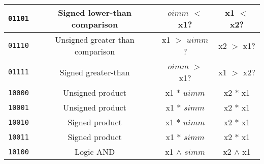 \begin{center}
\begin{longtable}{|c|c|c|c|}
    \texttt{01101}                       &
    Signed lower-than comparison         &
    $oimm$ $<$ x1?                       &
    x1 $<$ x2?                           \\ \hline

    \texttt{01110}                       &
    Unsigned greater-than comparison     &
    x1 $>$ $uimm$?                       &
    x2 $>$ x1?                           \\ \hline

    \texttt{01111}                       &
    Signed greater-than                  &
    $oimm$ $>$ x1?                       &
    x1 $>$ x2?                           \\ \hline
      
      \texttt{10000}                     &
      Unsigned product                   &
      x1 $*$ $uimm$                      &
      x2 $*$ x1                          \\ \hline
                                         
      \texttt{10001}                     &
      Unsigned product                   &
      x1 $*$ $simm$                      &
      x2 $*$ x1                          \\ \hline
                                         
      \texttt{10010}                     &
      Signed product                     &
      x1 $*$ $uimm$                      &
      x2 $*$ x1                          \\ \hline
                                         
      \texttt{10011}                     &
      Signed product                     &
      x1 $*$ $simm$                      &
      x2 $*$ x1                          \\ \hline
                                         
      \texttt{10100}                     &
      Logic AND                          &
      x1 $\land$ $simm$                  &
      x2 $\land$ x1                      \\ \hline
                                         

\end{longtable}
\end{center}
